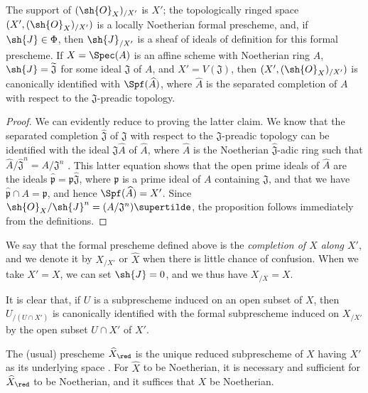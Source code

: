 \begin{proposition}[10.8.5]
\label{I.10.8.5}
The support of $(\sh{O}_X)_{/X'}$ is $X'$; the topologically ringed space $(X',(\sh{O}_X)_{/X'})$ is a locally Noetherian formal prescheme, and, if $\sh{J}\in\Phi$, then $\sh{J}_{/X'}$ is a sheaf of ideals of definition for this formal prescheme.
If $X=\Spec(A)$ is an affine scheme with Noetherian ring $A$, $\sh{J}=\widetilde{\mathfrak{J}}$ for some ideal $\mathfrak{J}$ of $A$, and $X'=V(\mathfrak{J})$, then $(X',(\sh{O}_X)_{/X'})$ is canonically identified with $\Spf(\widehat{A})$, where $\widehat{A}$ is the separated completion of $A$ with respect to the $\mathfrak{J}$-preadic topology.
\end{proposition}

\begin{proof}
We can evidently reduce to proving the latter claim.
We know  that the separated completion $\widehat{\mathfrak{J}}$ of $\mathfrak{J}$ with respect to the $\mathfrak{J}$-preadic topology can be identified with the ideal $\mathfrak{J}\widehat{A}$ of $\widehat{A}$, where $\widehat{A}$ is the Noetherian $\widehat{\mathfrak{J}}$-adic ring such that $\widehat{A}/\widehat{\mathfrak{J}}^n=A/\mathfrak{J}^n$ .
This latter equation shows that the open prime ideals of $\widehat{A}$ are the ideals $\widehat{\mathfrak{p}}=\mathfrak{p}\widehat{\mathfrak{J}}$, where $\mathfrak{p}$ is a prime ideal of $A$ containing $\mathfrak{J}$, and that we have $\widehat{\mathfrak{p}}\cap A=\mathfrak{p}$, and hence $\Spf(\widehat{A})=X'$.
Since $\sh{O}_X/\sh{J}^n=(A/\mathfrak{J}^n)\supertilde$, the proposition follows immediately from the definitions.
\end{proof}

We say that the formal prescheme defined above is the \emph{completion of $X$ along $X'$}, and we denote it by $X_{/X'}$ or $\widehat{X}$ when there is little chance of confusion.
When we take $X'=X$, we can set $\sh{J}=0$, and we thus have $X_{/X}=X$.

It is clear that, if $U$ is a subprescheme induced on an open subset of $X$, then $U_{/(U\cap X')}$ is canonically identified with the formal subprescheme induced on $X_{/X'}$ by the open subset $U\cap X'$ of $X'$.

\begin{corollary}[10.8.6]
\label{I.10.8.6}
The (usual) prescheme $\widehat{X}_\red$ is the unique reduced subprescheme of $X$ having $X'$ as its underlying space .
For $\widehat{X}$ to be Noetherian, it is necessary and sufficient for $\widehat{X}_\red$ to be Noetherian, and it suffices that $X$ be Noetherian.
\end{corollary}

